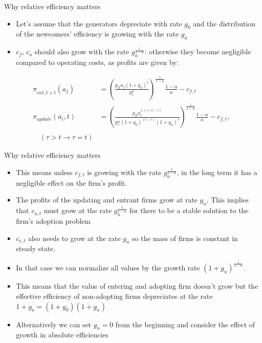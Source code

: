 \documentclass{beamer}
\begin{document}
\begin{frame}{Why relative efficiency matters}\label{rel_eff_why}
\small\begin{itemize}
    \item Let's assume that the generators depreciate with rate $g_0$ and the distribution of the newcomers' efficiency is growing with the rate $g_n$
    \item $c_f$, $c_a$ should also grow with the rate $g_n^\frac{1}{1-\alpha}$: otherwise they become negligible compared to operating costs, as profits are given by:\\
\end{itemize}
\begin{align*}
        \pi_{ent,t+\hat{t}}(a_j) &= \left(\frac{p_E a_j\left(1+g_n\right)^\hat{t}}{p_e^\alpha}\right)^{\frac{1}{1-\alpha}} \frac{1-\alpha}{\alpha} - c_{f,t}\\
        \pi_{update}(a_i,t) &= \left(\frac{p_E a_i^{1+\gamma (t-\tau)}}{p_e^\alpha\left(1+g_0\right)^{(t-\tau)}\left(1+g_n\right)^\tau}\right)^{\frac{1}{1-\alpha}} \frac{1-\alpha}{\alpha}-c_{f,t}, \\\\ \quad (\tau>t \rightarrow \tau = t)
    \end{align*}
\end{frame}
\begin{frame}{Why relative efficiency matters}\label{rel_eff2}
    \begin{itemize}
        \item This means unless $c_{f,t}$ is growing with the rate $g_n^\frac{1}{1-\alpha}$, in the long term it has a negligible effect on the firm's profit. 
        \item The profits of the updating and entrant firms grow at rate $g_n$. This implies that $c_{a,t}$ must grow at the rate $g_n^\frac{1}{1-\alpha}$ for there to be a stable solution to the firm's adoption problem
        \item $c_{e,t}$ also needs to grow at the rate $g_n$ so the mass of firms is constant in steady state.
        \item In that case we can normalize all values by the growth rate $(1+g_n)^\frac{1}{1-\alpha}$. 
        \item This means that the value of entering and adopting firm doesn't grow but the effective efficiency of non-adopting firms depreciates at the rate $1+g_a = (1+g_0)(1+g_n)$
        \item Alternatively we can set $g_n=0$ from the beginning and consider the effect of growth in absolute efficiencies
    \end{itemize}
    \hyperlink{gen_problem}{}
    \hyperlink{mainss}{}
    \hyperlink{Data}{}
    
\end{frame}
\end{document}
